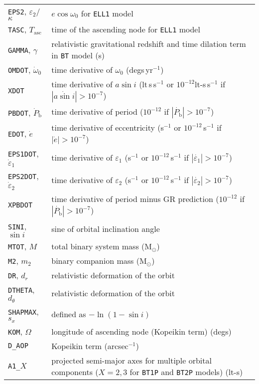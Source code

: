 \begin{longtable}{p{}|p{}}
{\tt EPS2}, $\varepsilon_2$/$\kappa$ & $e\cos{\omega_0}$ for {\tt ELL1} model \citep[see Appendix in][]{2001MNRAS.326..274L} \\
{\tt TASC}, $T_{\text{asc}}$ & time of the ascending node for {\tt ELL1} model \citep[see Appendix in][]{2001MNRAS.326..274L} \\
{\tt GAMMA}, $\gamma$ & relativistic gravitational redshift and time dilation term in {\tt BT} model (s) \\
{\tt OMDOT}, $\dot{\omega}_0$ & time derivative of $\omega_0$ (degs\,yr$^{-1}$) \\
{\tt XDOT} & time derivative of $a\sin{i}$ (lt\,s\,s$^{-1}$ or $10^{-12}$lt-s\,s$^{-1}$ if $|\dot{a\sin{i}}| > 10^{-7}$)  \\
{\tt PBDOT}, $\dot{P}_{\text{b}}$ & time derivative of period ($10^{-12}$ if $|\dot{P_{\text{b}}}| > 10^{-7}$) \\
{\tt EDOT}, $\dot{e}$ & time derivative of eccentricity (s$^{-1}$ or $10^{-12}$\,s$^{-1}$ if $|\dot{e}| > 10^{-7}$) \\
{\tt EPS1DOT}, $\dot{\varepsilon}_1$ & time derivative of $\varepsilon_1$ (s$^{-1}$ or $10^{-12}$\,s$^{-1}$ if $|\dot{\varepsilon_1}| > 10^{-7}$) \\
{\tt EPS2DOT}, $\dot{\varepsilon}_2$ & time derivative of $\varepsilon_2$ (s$^{-1}$ or $10^{-12}$\,s$^{-1}$ if $|\dot{\varepsilon_2}| > 10^{-7}$) \\
{\tt XPBDOT} & time derivative of period minus GR prediction ($10^{-12}$ if $|\dot{P_{\text{b}}}| > 10^{-7}$) \\
{\tt SINI}, $\sin{i}$ & sine of orbital inclination angle \\
{\tt MTOT}, $M$ & total binary system mass (M$_{\odot}$) \\
{\tt M2}, $m_2$ & binary companion mass (M$_{\odot}$) \\
{\tt DR}, $d_r$ & relativistic deformation of the orbit \\
{\tt DTHETA}, $d_{\theta}$ & relativistic deformation of the orbit \\
{\tt SHAPMAX}, $s_x$ & defined as $-\ln{(1-\sin{i})}$ \\
{\tt KOM}, $\Omega$ & longitude of ascending node (Kopeikin term) (degs) \\
{\tt D\_AOP} & Kopeikin term (arcsec$^{-1}$) \citep[see, e.g., Section~2.7.1 of][]{2006MNRAS.372.1549E} \\
{\tt A1\_}$X$ & projected semi-major axes for multiple orbital components ($X=2,3$ for {\tt BT1P} and {\tt BT2P} models) (lt-s) \\

\end{longtable}

